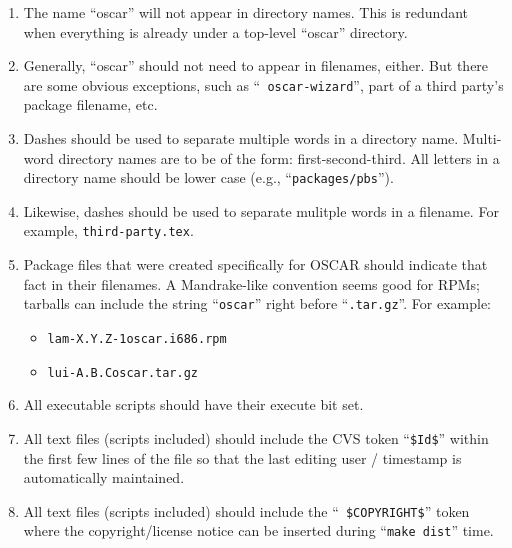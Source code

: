 \begin{enumerate}
\item The name ``oscar'' will not appear in directory names.  This is
  redundant when everything is already under a top-level ``oscar''
  directory.
  
\item Generally, ``oscar'' should not need to appear in filenames,
  either.  But there are some obvious exceptions, such as ``{\tt
    oscar-wizard}'', part of a third party's package filename, etc.
  
\item Dashes should be used to separate multiple words in a directory
  name.  Multi-word directory names are to be of the form:
  first-second-third.  All letters in a directory name should be lower
  case (e.g., ``{\tt packages/pbs}'').

\item Likewise, dashes should be used to separate mulitple words in a
  filename.  For example, {\tt third-party.tex}.
  
\item Package files that were created specifically for OSCAR should
  indicate that fact in their filenames.  A Mandrake-like convention
  seems good for RPMs; tarballs can include the string ``{\tt oscar}''
  right before ``{\tt .tar.gz}''.  For example:

  \begin{itemize}
  \item {\tt lam-{\rm X}.{\rm Y}.{\rm Z}-1oscar.i686.rpm}
  \item {\tt lui-{\rm A}.{\rm B}.{\rm C}oscar.tar.gz}
  \end{itemize}

\item All executable scripts should have their execute bit set.
  
\item All text files (scripts included) should include the CVS token
  ``{\tt \$Id\$}'' within the first few lines of the file so that the
  last editing user / timestamp is automatically maintained.
  
\item All text files (scripts included) should include the ``{\tt
    \$COPYRIGHT\$}'' token where the copyright/license notice can be
  inserted during ``{\tt make dist}'' time.

\end{enumerate}

